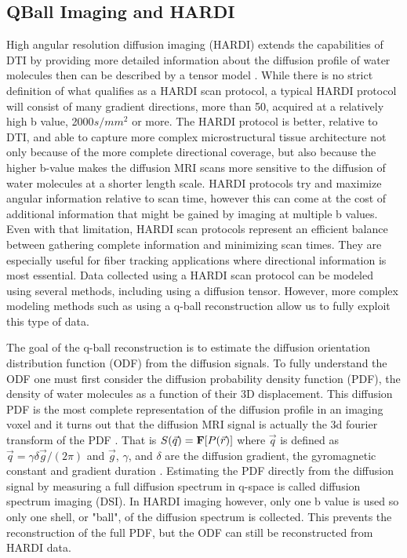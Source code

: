 \subsection{QBall Imaging and HARDI}

    High angular resolution diffusion imaging (HARDI) extends the capabilities of DTI by providing more detailed information about the diffusion profile of water molecules then can be described by a tensor model \cite{Tuch_2002}. While there is no strict definition of what qualifies as a HARDI scan protocol, a typical HARDI protocol will consist of many gradient directions, more than 50, acquired at a relatively high b value, 2000$s/mm^2$ or more. The HARDI protocol is better, relative to DTI, and able to capture more complex microstructural tissue architecture not only because of the more complete directional coverage, but also because the higher b-value makes the diffusion MRI scans more sensitive to the diffusion of water molecules at a shorter length scale. HARDI protocols try and maximize angular information relative to scan time, however this can come at the cost of additional information that might be gained by imaging at multiple b values. Even with that limitation, HARDI scan protocols represent an efficient balance between gathering complete information and minimizing scan times. They are especially useful for fiber tracking applications where directional information is most essential. Data collected using a HARDI scan protocol can be modeled using several methods, including using a diffusion tensor. However, more complex modeling methods such as using a q-ball reconstruction allow us to fully exploit this type of data.
    
    The goal of the q-ball reconstruction is to estimate the diffusion orientation distribution function (ODF) from the diffusion signals. To fully understand the ODF one must first consider the diffusion probability density function (PDF), the density of water molecules as a function of their 3D displacement. This diffusion PDF is the most complete representation of the diffusion profile in an imaging voxel and it turns out that the diffusion MRI signal is actually the 3d fourier transform of the PDF \cite{Wedeen_2005, Wedeen_2008}. That is $S(\vec{q}) = \bold{F}[P(\vec{r})]$ where $\vec{q}$ is defined as $\vec{q} = \gamma\delta\vec{g}/(2\pi)$ and $\vec{g}$, $\gamma$, and $\delta$ are the diffusion gradient, the gyromagnetic constant and gradient duration \cite{Tuch_2004}. Estimating the PDF directly from the diffusion signal by measuring a full diffusion spectrum in q-space is called diffusion spectrum imaging (DSI). In HARDI imaging however, only one b value is used so only one shell, or "ball", of the diffusion spectrum is collected. This prevents the reconstruction of the full PDF, but the ODF can still be reconstructed from HARDI data.
    
